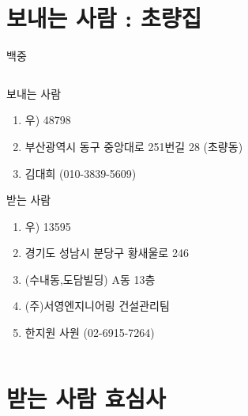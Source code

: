 \documentclass[aspectratio=1610,12pt,xcolor=pdftex,dvipsnames,table,handout]{beamer}
\begin{document}
		\section{보내는 사람 : 초량집 }
		\begin{frame}[c,plain]{백중}

		\begin{columns}[t]
		\begin{column}{0.6\textwidth}

			\begin{block} {보내는 사람}
			\begin{enumerate}
			\item [] 우) 48798
			\item [] 부산광역시 동구 중앙대로 251번길 28 (초량동)
			\item [] 김대희 (010-3839-5609)
			\end{enumerate}
			\end{block}


			\begin{block} {받는 사람}
			\begin{enumerate}
			\item [] 우) 13595
			\item [] 경기도 성남시 분당구 황새울로 246
			\item []  (수내동,도담빌딩) A동 13층
			\item [] (주)서영엔지니어링 건설관리팀
			\item [] 한지원 사원 (02-6915-7264)
			\end{enumerate}
			\end{block}

		\end{column}

		\end{columns}
		\null
		\end{frame}



		\section{받는 사람 효심사 }
	
\end{document}
